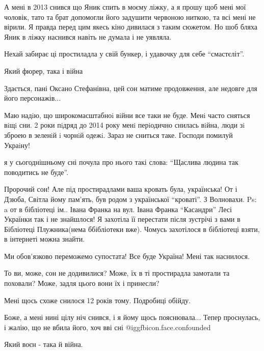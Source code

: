 \begin{itemize}
А мені в 2013 снився що Яник спить в моєму ліжку, а я прошу щоб мені мої
чоловік, тато та брат допомогли його задушити червоною ниткою, та всі мені не
вірили. Я правда перед цим якесь кіно дивилася з таким сюжетом. Но шоб бляха
Яник в ліжку наснився навіть не думала і не уявляла.

Нехай забирає ці простиладла у свій бункер, і удавочку для себе \enquote{смастєліт}.

Який фюрер, така і війна


Здається, пані Оксано Стефанівна, цей сон матиме продовження, але недовге для його персонажів...


Маю надiю, що широкомасштабноi вiйни все таки не буде. Менi часто сняться вiщi
сни. 2 роки пiдряд до 2014 року менi перiодично снилась вiйна, люди зi зброею в
зеленiй i чорнiй одежi. Зараз не сниться таке. Господи помилуй Украiну!


я у сьогоднішньому сні почула про нього такі слова: \enquote{Щаслива людина так поводитись не буде}.


Пророчий сон! Але під простирадлами ваша кровать була, українська! От і Дзюба,
Світла йому пам'ять, був родом з української \enquote{кроваті}. З Волновахи. Ps: a от в
бібліотеці ім.. Івана Франка на вул. Івана Франка \enquote{Касандри} Лесі Українки так
і не знайшлося! Я захотіла її перестати після зустрічі з вами в Бібліотеці
Плужника(нема ббібліотеки вже). Чомусь захотілося в бібліотеці взяти, в
інтернеті можна знайти.



Ми обов'язково переможемо супостата! Все буде Україна! Мені так наснилося.


То ви, може, сон не додивилися?
Може, їх в ті простирадла замотали та поховали?
Може, задля цього вони їх і принесли?

Мені щось схоже снилося 12 років тому. Подробиці обійду.


Боже, а мені нині цілу ніч снився, і я йому щось пояснювала... Тепер проснулась,
і жалію, що не вбила його, хоч вві сні  @igg{fbicon.face.confounded} 

Який воєн - така й війна.


\end{itemize}

